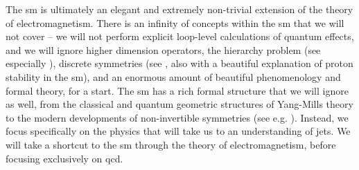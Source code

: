 The \gls{sm} is ultimately an elegant and extremely non-trivial extension of the theory of electromagnetism.
%
There is an infinity of concepts within the \gls{sm} that we will not cover -- we will not perform explicit loop-level calculations of quantum effects, and we will ignore higher dimension operators, the hierarchy problem (see especially ), discrete  symmetries (see , also with a beautiful explanation of proton stability in the \gls{sm}), and an enormous amount of beautiful phenomenology and formal theory, for a start.
%
The \gls{sm} has a rich formal structure that we will ignore as well, from the classical and quantum geometric structures of Yang-Mills theory to the modern developments of non-invertible symmetries (see e.g. ).
%
Instead, we focus specifically on the physics that will take us to an understanding of jets.
%
We will take a shortcut to the \gls{sm} through the theory of electromagnetism, before focusing exclusively on \gls{qcd}.



